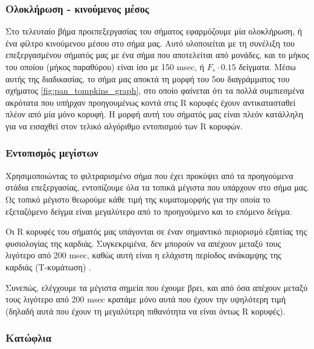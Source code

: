 \subsubsection*{Ολοκλήρωση - κινούμενος μέσος}

Στο τελευταίο βήμα προεπεξεργασίας του σήματος εφαρμόζουμε μία ολοκλήρωση, ή ένα φίλτρο κινούμενου μέσου στο σήμα μας. Αυτό υλοποιείται με τη συνέλιξη του επεξεργασμένου σήματός μας με ένα σήμα που αποτελείται από μονάδες, και το μήκος του οποίου (μήκος παραθύρου) είναι ίσο με 150 msec, ή $F_s\cdot0.15$ δείγματα. Μέσω αυτής της διαδικασίας, το σήμα μας αποκτά τη μορφή του 5ου διαγράμματος του σχήματος \ref{fig:pan_tompkins_graph}, στο οποίο φαίνεται ότι τα πολλά συμπιεσμένα ακρότατα που υπήρχαν προηγουμένως κοντά στις R κορυφές έχουν αντικατασταθεί πλέον από μία μόνο κορυφή. Η μορφή αυτή του σήματός μας είναι πλεόν κατάλληλη για να εισαχθεί στον τελικό αλγόριθμο εντοπισμού των R κορυφών.

\subsubsection*{Εντοπισμός μεγίστων}

Χρησιμοποιώντας το φιλτραρισμένο σήμα που έχει προκύψει από τα προηγούμενα στάδια επεξεργασίας, εντοπίζουμε όλα τα τοπικά μέγιστα που υπάρχουν στο σήμα μας. Ως τοπικό μέγιστο θεωρούμε κάθε τιμή της κυματομορφής για την οποία το εξεταζόμενο δείγμα είναι μεγαλύτερο από το προηγούμενο και το επόμενο δείγμα. 

Οι R κορυφές του σήματός μας υπάγονται σε έναν σημαντικό περιορισμό εξαιτίας της φυσιολογίας της καρδιάς. Συγκεκριμένα, δεν μπορούν να απέχουν μεταξύ τους λιγότερο από 200 msec, καθώς αυτή είναι η ελάχιστη περίοδος ανάκαμψης της καρδιάς (Τ-κυμάτωση) \cite{wikiT_wave}. 

Συνεπώς, ελέγχουμε τα μέγιστα σημεία που έχουμε βρει, και από όσα απέχουν μεταξύ τους λιγότερο από 200 msec κρατάμε μόνο αυτά που έχουν την υψηλότερη τιμή (δηλαδή αυτά που έχουν τη μεγαλύτερη πιθανότητα να είναι όντως R κορυφές).

\subsubsection*{Κατώφλια}

